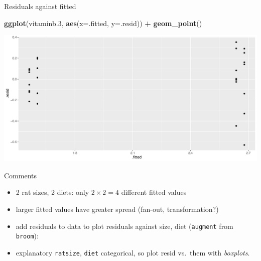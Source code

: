 \documentclass[
  ignorenonframetext,
]{beamer}
\newenvironment{Shaded}{\begin{snugshade}}{\end{snugshade}}
\newcommand{\DataTypeTok}[1]{\textcolor[rgb]{0.13,0.29,0.53}{#1}}
\newcommand{\FloatTok}[1]{\textcolor[rgb]{0.00,0.00,0.81}{#1}}
\newcommand{\KeywordTok}[1]{\textcolor[rgb]{0.13,0.29,0.53}{\textbf{#1}}}
\newcommand{\NormalTok}[1]{#1}
\newcommand{\OperatorTok}[1]{\textcolor[rgb]{0.81,0.36,0.00}{\textbf{#1}}}
\newcommand{\StringTok}[1]{\textcolor[rgb]{0.31,0.60,0.02}{#1}}
\providecommand{\tightlist}{%
  \setlength{\itemsep}{0pt}\setlength{\parskip}{0pt}}
\begin{document}
\begin{frame}[fragile]{Residuals against fitted}
\protect\hypertarget{residuals-against-fitted}{}

\begin{Shaded}
\begin{Highlighting}[]
\KeywordTok{ggplot}\NormalTok{(vitaminb}\FloatTok{.3}\NormalTok{, }\KeywordTok{aes}\NormalTok{(}\DataTypeTok{x=}\NormalTok{.fitted, }\DataTypeTok{y=}\NormalTok{.resid)) }\OperatorTok{+}\StringTok{ }\KeywordTok{geom_point}\NormalTok{()}
\end{Highlighting}
\end{Shaded}

\includegraphics{slides_d29_files/figure-beamer/unnamed-chunk-205-1.pdf}

\end{frame}

\begin{frame}[fragile]{Comments}
\protect\hypertarget{comments-17}{}

\begin{itemize}
\tightlist
\item
  2 rat sizes, 2 diets: only \(2 \times 2 = 4\) different fitted values
\item
  larger fitted values have greater spread (fan-out, transformation?)
\item
  add residuals to data to plot residuals against size, diet
  (\texttt{augment} from \texttt{broom}):
\end{itemize}

\begin{Shaded}
\end{Shaded}

\begin{itemize}
\tightlist
\item
  explanatory \texttt{ratsize}, \texttt{diet} categorical, so plot resid
  vs.~them with \emph{boxplots}.
\end{itemize}

\end{frame}
\end{document}
